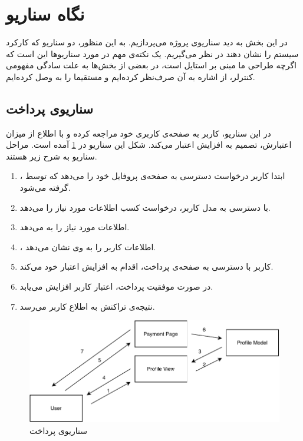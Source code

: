 \section*{
نگاه سناریو
}
در این بخش به دید سناریو‌ی پروژه می‌پردازیم. به این منظور، دو سناریو که کارکرد سیستم را نشان دهند در نظر می‌گیریم. یک نکته‌ی مهم در مورد سناریو‌ها این است که اگرچه طراحی ما مبنی بر استایل
است، در بعضی از بخش‌ها به علت سادگی مفهومی کنترلر، از اشاره به آن صرف‌نظر کرده‌ایم و مستقیما 
را به 
وصل کرده‌ایم. 
\subsection*{سناریو‌ی پرداخت}
در این سناریو، کاربر به صفحه‌ی کاربری خود مراجعه کرده و با اطلاع از میزان اعتبارش، تصمیم به افزایش اعتبار می‌کند.
شکل این سناریو در 
\ref{figscen:1}
آمده است. مراحل سناریو به شرح زیر هستند.
\begin{enumerate}
	\item 
	ابتدا کاربر درخواست دسترسی به صفحه‌ی پروفایل خود را می‌دهد که توسط 
	، گرفته می‌شود.
	\item 
{}
با دسترسی به مدل کاربر، درخواست کسب اطلاعات مورد نیاز را  می‌دهد.
\item 
{}
اطلاعات مورد نیاز را به 
می‌دهد.
\item 
{}، 
اطلاعات کاربر را به وی نشان می‌دهد.
\item 
کاربر با دسترسی به صفحه‌ی پرداخت، اقدام به افزایش اعتبار خود می‌کند.
\item 
در صورت موفقیت پرداخت، اعتبار کاربر افزایش می‌یابد.
\item 
نتیجه‌ی تراکنش به اطلاع کاربر می‌رسد.
\end{enumerate}
\begin{figure}[H]
	\centering
	\includegraphics[width=\textwidth]{diagrams/payment.pdf}
	\caption{سناریو‌ی پرداخت ‌ }
	\label{figscen:1}	
\end{figure}
